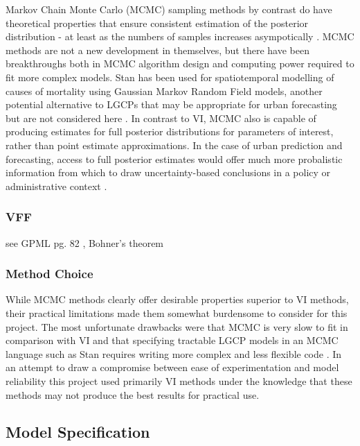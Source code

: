 Markov Chain Monte Carlo (MCMC) sampling methods by contrast do have theoretical properties that ensure consistent estimation of the posterior distribution - at least  as the numbers of samples increases asympotically \cite{teng_2017}. MCMC methods are not a new development in themselves, but there have been breakthroughs both in MCMC algorithm design and computing power required to fit more complex models. Stan has been used for spatiotemporal modelling of causes of mortality using Gaussian Markov Random Field models, another potential alternative to LGCPs that may be appropriate for urban forecasting but are not considered here \cite{foreman_2017}. In contrast to VI, MCMC also is capable of producing estimates for full posterior distributions for parameters of interest, rather than point estimate approximations. In the case of urban prediction and forecasting, access to full posterior estimates would offer much more probalistic information from which to draw uncertainty-based conclusions in a policy or administrative context .

\subsubsection{VFF}

see GPML pg. 82 , Bohner's theorem


\subsubsection{Method Choice}

While MCMC methods clearly offer desirable properties superior to VI methods, their practical limitations made them somewhat burdensome to consider for this project. The most unfortunate drawbacks were that MCMC is very slow to fit in comparison with VI and that specifying tractable LGCP models in an MCMC language such as Stan requires writing more complex and less flexible code \cite{Flaxman2015FastHG}. In an attempt to draw a compromise between ease of experimentation and model reliability this project used primarily VI methods under the knowledge that these methods may not produce the best results for practical use.


\subsection{Model Specification}


